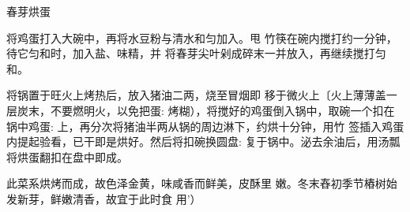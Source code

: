 \begin{recipe}{春芽烘蛋}

\ingredients


\cooking

\step 	将鸡蛋打入大碗中，再将水豆粉与清水和匀加入。甩 竹筷在碗内搅打约一分钟，待它匀和时，加入盐、味精，并 将春芽尖叶剁成碎末一并放入，再继续搅打匀和。

\step 	将锅置于旺火上烤热后，放入猪油二两，烧至冒烟即 移于微火上〔火上薄薄盖一层炭末，不要燃明火，以免把蛋: 烤糊），将搅好的鸡蛋倒入锅中，取碗一个扣在锅中鸡蛋: 上，再分次将猪油半两从锅的周边淋下，约烘十分钟，用竹 签插入鸡蛋内提起验看，已干即是烘好。然后将扣碗换圆盘: 复于锅中。泌去余油后，用汤瓢将烘蛋翻扣在盘中即成。

\notes

此菜系烘烤而成，故色泽金黄，味咸香而鲜美，皮酥里 嫩。冬末舂初季节樁树始发新芽，鲜嫩清香，故宜于此时食 用'）

\end{recipe}

